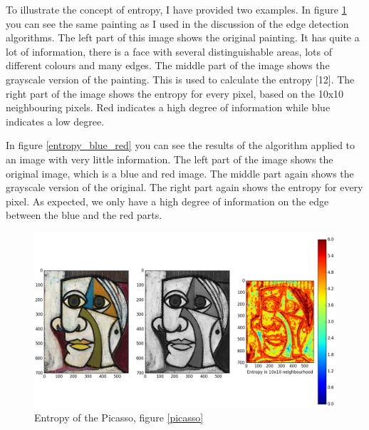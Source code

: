 \documentclass[12pt]{article}
\begin{document}
To illustrate the concept of entropy, I have provided two examples. In figure \ref{entropy_picasso} you can see the same painting as I used in the discussion of the edge detection algorithms. The left part of this image shows the original painting. It has quite a lot of information, there is a face with several distinguishable areas, lots of different colours and many edges. The middle part of the image shows the grayscale version of the painting. This is used to calculate the entropy [12]. The right part of the image shows the entropy for every pixel, based on the 10x10 neighbouring pixels. Red indicates a high degree of information while blue indicates a low degree.
\newline

In figure \ref{entropy_blue_red} you can see the results of the algorithm applied to an image with very little information. The left part of the image shows the original image, which is a blue and red image. The middle part again shows the grayscale version of the original. The right part again shows the entropy for every pixel. As expected, we only have a high degree of information on the edge between the blue and the red parts.
  
\begin{figure}[H]
\hspace*{-0.8cm}
\centering
\includegraphics[scale = 0.35]{img/entropy_picasso}
\caption{Entropy of the Picasso, figure \ref{picasso}}
\label{entropy_picasso}
\end{figure} 
\end{document}
